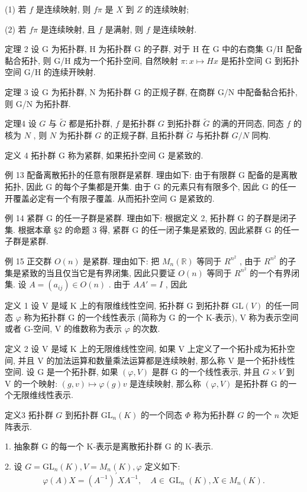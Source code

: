 \documentclass[]{article}
\begin{document}
(1) 若 $f$ 是连续映射, 则 $f\pi$ 是 $X$ 到 $Z$ 的连续映射; 

(2) 若 $f\pi$ 是连续映射, 且 $f$ 是满射, 则 $f$ 是连续映射. 

定理 2 设 G 为拓扑群, H 为拓扑群 G 的子群, 对于 H 在 G 中的右商集 G/H 配备黏合拓扑, 则 G/H 成为一个拓扑空间, 自然映射 $\pi: x \mapsto Hx$ 是拓扑空间 G 到拓扑空间 G/H 的连续开映射. 

定理 3 设 G 为拓扑群, N 为拓扑群 G 的正规子群, 在商群 G/N 中配备黏合拓扑, 则 G/N 为拓扑群. 

定理4 设 $G$ 与 $\widetilde{G}$ 都是拓扑群, $f$ 是拓扑群 $G$ 到拓扑群 $\widetilde{G}$ 的满的开同态, 同态 $f$ 的核为 $N$ , 则 $N$ 为拓扑群 $G$ 的正规子群, 且拓扑群 $\widetilde{G}$ 与拓扑群 $G / N$ 同构. 

定义 4 拓扑群 G 称为紧群, 如果拓扑空间 G 是紧致的. 

例 13 配备离散拓扑的任意有限群是紧群. 理由如下: 由于有限群 G 配备的是离散拓扑, 因此 G 的每个子集都是开集. 由于 G 的元素只有有限多个, 因此 G 的任一开覆盖必定有一个有限子覆盖. 从而拓扑空间 G 是紧致的. 

例 14 紧群 G 的任一子群是紧群. 理由如下: 根据定义 2, 拓扑群 G 的子群是闭子集. 根据本章 §2 的命题 3 得, 紧群 G 的任一闭子集是紧致的, 因此紧群 G 的任一子群是紧群. 

例 15 正交群 $O(n)$ 是紧群. 理由如下: 把 $M_{n}(\mathbb{R})$ 等同于 $R^{n^{2}}$ , 由于 $R^{n^{2}}$ 的子集是紧致的当且仅当它是有界闭集, 因此只要证 $O(n)$ 等同于 $R^{n^{2}}$ 的一个有界闭集. 设 $A = (a_{ij}) \in O(n)$ . 由于 $AA' = I$ , 因此 

定义 1 设 V 是域 K 上的有限维线性空间, 拓扑群 G 到拓扑群 $\mathrm{GL}(V)$ 的任一同态 $\varphi$ 称为拓扑群 G 的一个线性表示 (简称为 G 的一个 K-表示), V 称为表示空间或者 G-空间, V 的维数称为表示 $\varphi$ 的次数. 

定义 2 设 V 是域 K 上的无限维线性空间, 如果 V 上定义了一个拓扑成为拓扑空间, 并且 V 的加法运算和数量乘法运算都是连续映射, 那么称 V 是一个拓扑线性空间. 设 G 是一个拓扑群, 如果 $(\varphi, V)$ 是群 G 的一个线性表示, 并且 $G \times V$ 到 V 的一个映射: $(g, v) \longmapsto \varphi(g)v$ 是连续映射, 那么称 $(\varphi, V)$ 是拓扑群 G 的一个无限维线性表示. 

定义3 拓扑群 $G$ 到拓扑群 $\mathrm{GL}_n(K)$ 的一个同态 $\Phi$ 称为拓扑群 $G$ 的一个 $n$ 次矩阵表示. 

1. 抽象群 G 的每一个 K-表示是离散拓扑群 G 的 K-表示. 

2. 设 $G = \mathrm{GL}_n(K), V = M_n(K), \varphi$ 定义如下: $$
\varphi (A) X = (A ^ {- 1}) ^ {\prime} X A ^ {- 1}, \quad A \in \operatorname{GL} _ {n} (K), X \in M _ {n} (K).
$$
\end{document}
